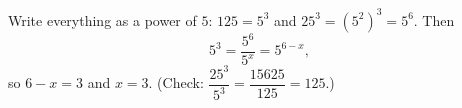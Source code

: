 Write everything as a power of $5$: $125=5^3$ and $25^3=(5^2)^3=5^6$. Then
\[5^3=\dfrac{5^6}{5^x}=5^{6-x},\]
so $6-x=3$ and $x=\boxed{3}$. (Check: $\dfrac{25^3}{5^3}=\dfrac{15625}{125}=125$.)
